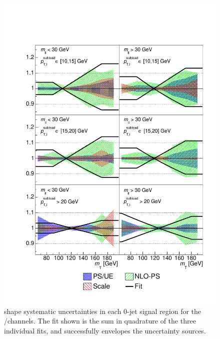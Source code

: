 \begin{figure}
	\includegraphics[width=\hugefigwidth]{tex/ww/mTshape_df_0j}
	\caption{\WW \mt shape systematic uncertainties in each 0-jet signal region for the 
	\emch/\mech channels. The fit shown is the sum in quadrature of the three individual 
	fits, and successfully envelopes the uncertainty sources.}
	\label{fig:ww_bkg:mTshape_0j}
\end{figure}

